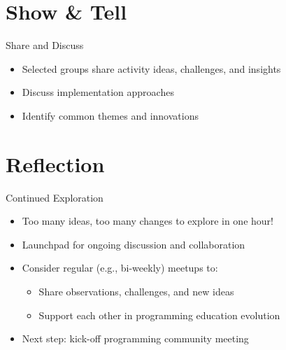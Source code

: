 \documentclass[xcolor=dvipsnames, aspectratio=169]{beamer}
\newcommand{\footername}{AI in Programming Education}
\newcommand{\setfooter}[2]{\renewcommand{\footername}{\href{#2}{#1}}}
\begin{document}
\section{Show \& Tell}
\setfooter{Discussion and Reflection}{https://github.com/neu-ece-esl/ai-prog-workshop}

\begin{frame}{Share and Discuss}
  \begin{itemize}
    \item Selected groups share activity ideas, challenges, and insights
    \item Discuss implementation approaches
    \item Identify common themes and innovations
  \end{itemize}
\end{frame}

\section{Reflection}
\setfooter{Discussion and Reflection}{https://github.com/neu-ece-esl/ai-prog-workshop}

\begin{frame}{Continued Exploration}
  \begin{itemize}
    \item Too many ideas, too many changes to explore in one hour!
    \item Launchpad for ongoing discussion and collaboration
    \item Consider regular (e.g., bi-weekly) meetups to:
      \begin{itemize}
        \item Share observations, challenges, and new ideas
        \item Support each other in programming education evolution
      \end{itemize}
    \item Next step: kick-off programming community meeting
  \end{itemize}
\end{frame}
\end{document}
